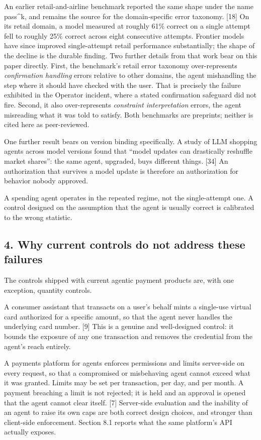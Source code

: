 \documentclass[
  11pt,
  letterpaper,
]{article}
\begin{document}
An earlier retail-and-airline benchmark reported the same shape under
the name pass\^{}k, and remains the source for the domain-specific error
taxonomy. {[}18{]} On its retail domain, a model measured at roughly
61\% correct on a single attempt fell to roughly 25\% correct across
eight consecutive attempts. Frontier models have since improved
single-attempt retail performance substantially; the shape of the
decline is the durable finding. Two further details from that work bear
on this paper directly. First, the benchmark's retail error taxonomy
over-represents \emph{confirmation handling} errors relative to other
domains, the agent mishandling the step where it should have checked
with the user. That is precisely the failure exhibited in the Operator
incident, where a stated confirmation safeguard did not fire. Second, it
also over-represents \emph{constraint interpretation} errors, the agent
misreading what it was told to satisfy. Both benchmarks are preprints;
neither is cited here as peer-reviewed.

One further result bears on version binding specifically. A study of LLM
shopping agents across model versions found that ``model updates can
drastically reshuffle market shares'': the same agent, upgraded, buys
different things. {[}34{]} An authorization that survives a model update
is therefore an authorization for behavior nobody approved.

A spending agent operates in the repeated regime, not the single-attempt
one. A control designed on the assumption that the agent is usually
correct is calibrated to the wrong statistic.

\subsection{4. Why current controls do not address these
failures}\label{why-current-controls-do-not-address-these-failures}

The controls shipped with current agentic payment products are, with one
exception, quantity controls.

A consumer assistant that transacts on a user's behalf mints a
single-use virtual card authorized for a specific amount, so that the
agent never handles the underlying card number. {[}9{]} This is a
genuine and well-designed control: it bounds the exposure of any one
transaction and removes the credential from the agent's reach entirely.

A payments platform for agents enforces permissions and limits
server-side on every request, so that a compromised or misbehaving agent
cannot exceed what it was granted. Limits may be set per transaction,
per day, and per month. A payment breaching a limit is not rejected; it
is held and an approval is opened that the agent cannot clear itself.
{[}7{]} Server-side evaluation and the inability of an agent to raise
its own caps are both correct design choices, and stronger than
client-side enforcement. Section 8.1 reports what the same platform's
API actually exposes.
\end{document}

